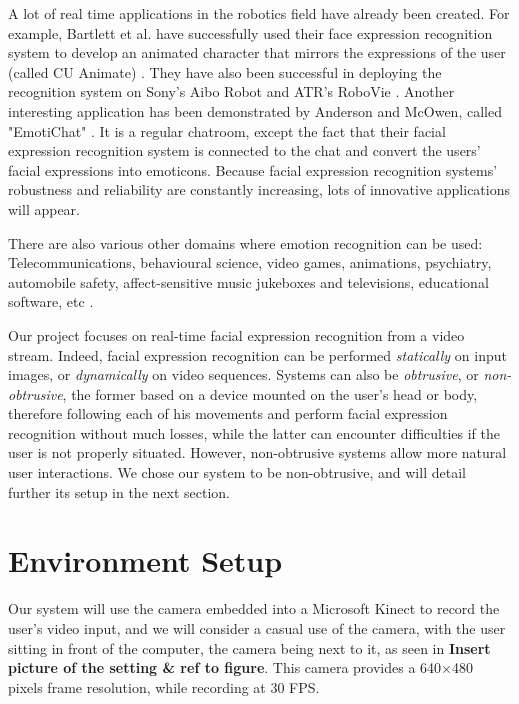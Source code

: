 \noindent A lot of real time applications in the robotics field have already been created. For example, Bartlett et al. have successfully used their face expression recognition system to develop an animated character that mirrors the expressions of the user (called CU Animate) \cite{BAR03}. They have also been successful in deploying the recognition system on Sony's Aibo Robot and ATR's RoboVie \cite{BAR03}. Another interesting application has been demonstrated by Anderson and McOwen, called "EmotiChat" \cite{AND06}. It is a regular chatroom, except the fact that their facial expression recognition system is connected to the chat and convert the users' facial expressions into emoticons. Because facial expression recognition systems' robustness and reliability are constantly increasing, lots of innovative applications will appear.
\newline

\noindent There are also various other domains where emotion recognition can be used: Telecommunications, behavioural science, video games, animations, psychiatry, automobile safety, affect-sensitive music jukeboxes and televisions, educational software, etc \cite{BET12}.
\newline

\noindent Our project focuses on real-time facial expression recognition from a video stream. Indeed, facial expression recognition can be performed \textit{statically} on input images, or \textit{dynamically} on video sequences. Systems can also be \textit{obtrusive}, or \textit{non-obtrusive}, the former based on a device mounted on the user's head or body, therefore following each of his movements and perform facial expression recognition without much losses, while the latter can encounter difficulties if the user is not properly situated. However, non-obtrusive systems allow more natural user interactions. We chose our system to be non-obtrusive, and will detail further its setup in the next section.
\newline

\section{Environment Setup}

\vspace{\baselineskip}
\noindent Our system will use the camera embedded into a Microsoft Kinect to record the user's video input, and we will consider a casual use of the camera, with the user sitting in front of the computer, the camera being next to it, as seen in \textbf{\color{red} Insert picture of the setting \& ref to figure}. This camera provides a 640$\times$480 pixels frame resolution, while recording at 30 FPS.
\newline

